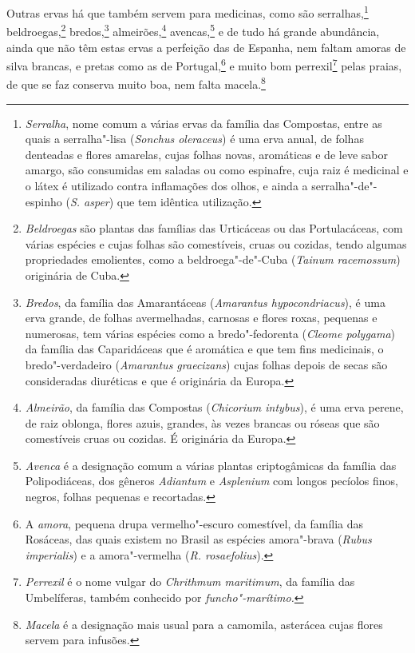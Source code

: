 Outras ervas há que também servem para medicinas, como são
serralhas,\footnote{ \textit{Serralha}, nome comum a várias ervas da
família das Compostas, entre as quais a serralha"-lisa (\textit{Sonchus
oleraceus}) é uma erva anual, de folhas denteadas e flores amarelas,
cujas folhas novas, aromáticas e de leve sabor amargo, são consumidas
em saladas ou como espinafre, cuja raiz é medicinal e o látex é
utilizado contra inflamações dos olhos, e ainda a serralha"-de"-espinho
(\textit{S. asper}) que tem idêntica utilização.} 
beldroegas,\footnote{ \textit{Beldroegas} são plantas das famílias das
Urticáceas ou das Portulacáceas, com várias espécies e cujas folhas são
comestíveis, cruas ou cozidas, tendo algumas propriedades emolientes,
como a beldroega"-de"-Cuba (\textit{Tainum racemossum}) originária de
Cuba.} bredos,\footnote{ \textit{Bredos}, da família das
Amarantáceas (\textit{Amarantus hypocondriacus}), é uma erva grande, de
folhas avermelhadas, carnosas e flores roxas, pequenas e numerosas, tem
várias espécies como a bredo"-fedorenta (\textit{Cleome polygama}) da
família das Caparidáceas que é aromática e que tem fins medicinais, o
bredo"-verdadeiro (\textit{Amarantus graecizans}) cujas folhas depois de
secas são consideradas diuréticas e que é originária da Europa.} 
almeirões,\footnote{ \textit{Almeirão}, da família das Compostas
(\textit{Chicorium intybus}), é uma erva perene, de raiz oblonga, flores
azuis, grandes, às vezes brancas ou róseas que são comestíveis cruas ou
cozidas. É originária da Europa.} avencas,\footnote{ \textit{Avenca} 
é a designação comum a várias plantas criptogâmicas
da família das Polipodiáceas, dos gêneros \textit{Adiantum} e 
\textit{Asplenium} com longos pecíolos finos, negros, folhas pequenas e
recortadas.} e de tudo há grande abundância, ainda que não têm estas
ervas a perfeição das de Espanha, nem faltam amoras de silva brancas, e
pretas como as de Portugal,\footnote{ A \textit{amora}, pequena drupa
vermelho"-escuro comestível, da família das Rosáceas, das quais existem
no Brasil as espécies amora"-brava (\textit{Rubus imperialis}) e a
amora"-vermelha (\textit{R. rosaefolius}).} e muito bom 
perrexil\footnote{ \textit{Perrexil} é o nome vulgar do \textit{Chrithmum
maritimum}, da família das Umbelíferas, também conhecido por
\textit{funcho"-marítimo.}} pelas praias, de que se faz conserva muito
boa, nem falta macela.\footnote{ \textit{Macela} é a designação mais
usual para a camomila, asterácea cujas flores servem para infusões.} 

